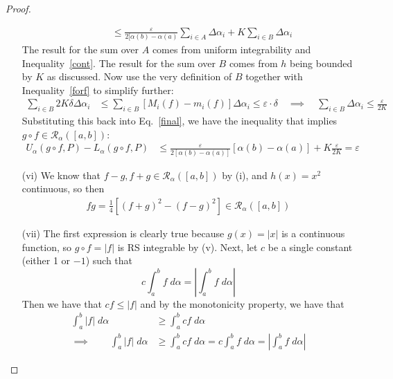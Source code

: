 \documentclass[12pt]{book}
\numberwithin{equation}{section} %
\theoremstyle{plain}
\theoremstyle{definition}
\theoremstyle{remark}
\begin{document}
\begin{proof}
\begin{enumerate}[label=(\roman*)]
\begin{align}
        \qquad
        &\leq \frac{\varepsilon}{2[\alpha(b)-\alpha(a)}
            \sum_{i\in A} \Delta\alpha_i+
            K \sum_{i\in B} \Delta\alpha_i
            \label{final}
    \end{align}
    The result for the sum over $A$ comes from uniform integrability and
    Inequality~\ref{cont}. The result for the sum over $B$ comes from
    $h$ being bounded by $K$ as discussed.
    Now use the very definition of $B$ together with
    Inequality~\ref{forf} to simplify further:
    \begin{align*}
        \sum_{i\in B}
        {2K}{\delta} \Delta\alpha_i &\leq
        \sum_{i\in B} \left[M_i(f) - m_i(f) \right]
        \Delta\alpha_i \leq \varepsilon\cdot\delta
        \quad\implies\quad
        \sum_{i\in B} \Delta\alpha_i
        \leq \frac{\varepsilon}{2K}
    \end{align*}
    Substituting this back into Eq.~\ref{final}, we have the
    inequality that implies $g\circ f\in\mathscr{R}_\alpha([a,b])$:
    \begin{align*}
        U_\alpha(g\circ f,P) - L_\alpha(g\circ f,P)
        &\leq \frac{\varepsilon}{2[\alpha(b)-\alpha(a)]}
            [\alpha(b)-\alpha(a)]
            + K\frac{\varepsilon}{2K}
            = \varepsilon
    \end{align*}

  \item[(vi)]
    We know that $f - g,f+g \in \mathscr{R}_\alpha([a,b])$
    by (i), and $h(x) = x^2$ continuous, so then
    \begin{align*}
      fg = \frac{1}{4} \left[(f+g)^2 - (f-g)^2 \right]
      \in\mathscr{R}_\alpha([a,b])
    \end{align*}

  \item[(vii)]
    The first expression is clearly true because $g(x)=|x|$
    is a continuous function, so $g\circ f = |f|$ is
    RS integrable by (v).
    Next, let $c$ be a single constant (either 1 or
    $-1$) such that
        \[ c\int^b_a f\; d\alpha = \left\lvert
        \int^b_a f\;d\alpha \right\rvert \]
    Then we have that $cf \leq |f|$ and by the monotonicity
    property, we have that
    \begin{align*}
        \int^b_a |f| \; d\alpha &\geq
            \int^b_a cf \; d\alpha \\
        \implies \qquad
        \int^b_a |f| \; d\alpha &\geq
            \int^b_a cf \; d\alpha =
            c \int^b_a f \; d\alpha =
            \left\lvert
            \int^b_a f \; d\alpha \right\rvert
    \end{align*}
\end{enumerate}
\end{proof}
\end{document}
